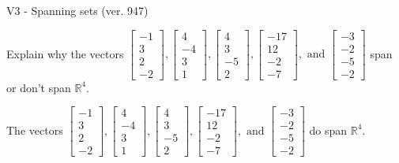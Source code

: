 \begin{exercise}
  \begin{exerciseTitle}V3 - Spanning sets (ver. 947)\end{exerciseTitle}
  \begin{exerciseStatement}
    Explain why the vectors \(\left[\begin{array}{r}
-1 \\
3 \\
2 \\
-2
\end{array}\right] , \left[\begin{array}{r}
4 \\
-4 \\
3 \\
1
\end{array}\right] , \left[\begin{array}{r}
4 \\
3 \\
-5 \\
2
\end{array}\right] , \left[\begin{array}{r}
-17 \\
12 \\
-2 \\
-7
\end{array}\right] , \text{ and } \left[\begin{array}{r}
-3 \\
-2 \\
-5 \\
-2
\end{array}\right]\) span or don't span \(\mathbb{R}^4\). 
	


  \end{exerciseStatement}
  \begin{exerciseAnswer}
   The vectors \(\left[\begin{array}{r}
-1 \\
3 \\
2 \\
-2
\end{array}\right] , \left[\begin{array}{r}
4 \\
-4 \\
3 \\
1
\end{array}\right] , \left[\begin{array}{r}
4 \\
3 \\
-5 \\
2
\end{array}\right] , \left[\begin{array}{r}
-17 \\
12 \\
-2 \\
-7
\end{array}\right] , \text{ and } \left[\begin{array}{r}
-3 \\
-2 \\
-5 \\
-2
\end{array}\right]\) 
  	 do  
	span \(\mathbb{R}^4\).
  



\end{exerciseAnswer}
\end{exercise}
